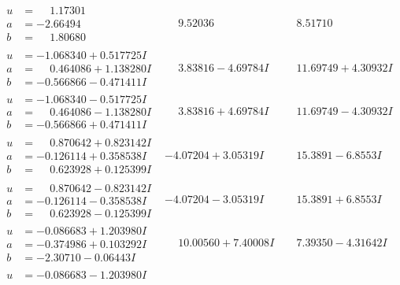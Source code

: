 \documentclass[1p]{elsarticle_modified}
\theoremstyle{definition}
\begin{document}
$$\begin{array}{c|c|c}
 \hline 
\begin{aligned}
u &= \phantom{-}1.17301\phantom{ +0.000000I} \\
a &= -2.66494\phantom{ +0.000000I} \\
b &= \phantom{-}1.80680\phantom{ +0.000000I}\end{aligned}
 & \phantom{-}9.52036\phantom{ +0.000000I} & \phantom{-}8.51710\phantom{ +0.000000I} \\ \hline\begin{aligned}
u &= -1.068340 + 0.517725 I \\
a &= \phantom{-}0.464086 + 1.138280 I \\
b &= -0.566866 - 0.471411 I\end{aligned}
 & \phantom{-}3.83816 - 4.69784 I & \phantom{-}11.69749 + 4.30932 I \\ \hline\begin{aligned}
u &= -1.068340 - 0.517725 I \\
a &= \phantom{-}0.464086 - 1.138280 I \\
b &= -0.566866 + 0.471411 I\end{aligned}
 & \phantom{-}3.83816 + 4.69784 I & \phantom{-}11.69749 - 4.30932 I \\ \hline\begin{aligned}
u &= \phantom{-}0.870642 + 0.823142 I \\
a &= -0.126114 + 0.358538 I \\
b &= \phantom{-}0.623928 + 0.125399 I\end{aligned}
 & -4.07204 + 3.05319 I & \phantom{-}15.3891 - 6.8553 I \\ \hline\begin{aligned}
u &= \phantom{-}0.870642 - 0.823142 I \\
a &= -0.126114 - 0.358538 I \\
b &= \phantom{-}0.623928 - 0.125399 I\end{aligned}
 & -4.07204 - 3.05319 I & \phantom{-}15.3891 + 6.8553 I \\ \hline\begin{aligned}
u &= -0.086683 + 1.203980 I \\
a &= -0.374986 + 0.103292 I \\
b &= -2.30710 - 0.06443 I\end{aligned}
 & \phantom{-}10.00560 + 7.40008 I & \phantom{-}7.39350 - 4.31642 I \\ \hline\begin{aligned}
u &= -0.086683 - 1.203980 I \\

\end{aligned}
\end{array}$$
\end{document}
